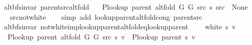 \begin{isabellebody}
%
\isadelimproof
\isanewline
%
\endisadelimproof
\isanewline
{}\isamarkupfalse%
\ {\isacharparenleft}{\kern0pt}\ alt{\isacharunderscore}{\kern0pt}bfs{\isacharunderscore}{\kern0pt}invar{\isacharparenright}{\kern0pt}\ parent{\isacharunderscore}{\kern0pt}src{\isacharunderscore}{\kern0pt}alt{\isacharunderscore}{\kern0pt}fold{\isacharcolon}{\kern0pt}\isanewline
\ \ \ {\isachardoublequoteopen}P{\isacharunderscore}{\kern0pt}lookup\ {\isacharparenleft}{\kern0pt}parent\ {\isacharparenleft}{\kern0pt}alt{\isacharunderscore}{\kern0pt}fold\ G{}\ G{}\ src\ s{\isacharparenright}{\kern0pt}{\isacharparenright}{\kern0pt}\ src\ {\isacharequal}{\kern0pt}\ None{\isachardoublequoteclose}\isanewline
%
\isadelimproof
\ \ %
\endisadelimproof
%
\isatagproof
{}\isamarkupfalse%
\ src{\isacharunderscore}{\kern0pt}not{\isacharunderscore}{\kern0pt}white\isanewline
\ \ \isamarkupfalse%
\ {\isacharparenleft}{\kern0pt}simp\ add{\isacharcolon}{\kern0pt}\ lookup{\isacharunderscore}{\kern0pt}parent{\isacharunderscore}{\kern0pt}alt{\isacharunderscore}{\kern0pt}fold{\isacharunderscore}{\kern0pt}cong\ parent{\isacharunderscore}{\kern0pt}src{\isacharparenright}{\kern0pt}%
\endisatagproof
{\isafoldproof}%
%
\isadelimproof
\isanewline
%
\endisadelimproof
%
\isadeliminvisible
\isanewline
%
\endisadeliminvisible
%
\isataginvisible
{}\isamarkupfalse%
\ {\isacharparenleft}{\kern0pt}\ alt{\isacharunderscore}{\kern0pt}bfs{\isacharunderscore}{\kern0pt}invar{\isacharparenright}{\kern0pt}\ not{\isacharunderscore}{\kern0pt}white{\isacharunderscore}{\kern0pt}imp{\isacharunderscore}{\kern0pt}lookup{\isacharunderscore}{\kern0pt}parent{\isacharunderscore}{\kern0pt}alt{\isacharunderscore}{\kern0pt}fold{\isacharunderscore}{\kern0pt}eq{\isacharunderscore}{\kern0pt}lookup{\isacharunderscore}{\kern0pt}parent{\isacharcolon}{\kern0pt}\isanewline
\ \ \ {\isachardoublequoteopen}{\isasymnot}\ white\ s\ v{\isachardoublequoteclose}\isanewline
\ \ \ {\isachardoublequoteopen}P{\isacharunderscore}{\kern0pt}lookup\ {\isacharparenleft}{\kern0pt}parent\ {\isacharparenleft}{\kern0pt}alt{\isacharunderscore}{\kern0pt}fold\ G{}\ G{}\ src\ s{\isacharparenright}{\kern0pt}{\isacharparenright}{\kern0pt}\ v\ {\isacharequal}{\kern0pt}\ P{\isacharunderscore}{\kern0pt}lookup\ {\isacharparenleft}{\kern0pt}parent\ s{\isacharparenright}{\kern0pt}\ v{\isachardoublequoteclose}%
\endisataginvisible
{\isafoldinvisible}%
%
\isadeliminvisible
\isanewline

\end{isabellebody}
